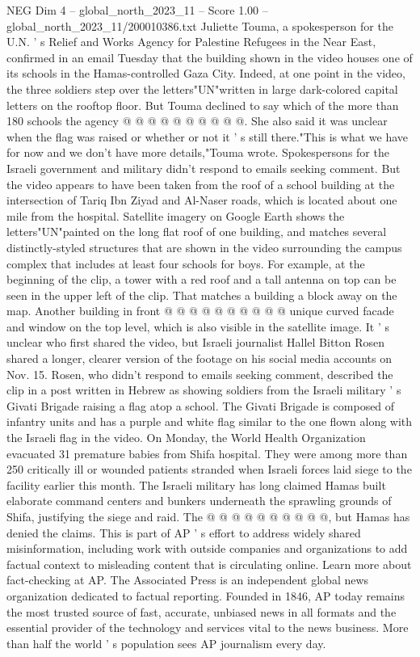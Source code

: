 \begin{textsample}{NEG Dim 4 – global\_north\_2023\_11 – Score 1.00 – global\_north\_2023\_11/200010386.txt}
Juliette Touma, a spokesperson for the U.N. ' s Relief and Works Agency for Palestine Refugees in the Near East, confirmed in an email Tuesday that the building shown in the video houses one of its schools in the Hamas-controlled Gaza City.
Indeed, at one point in the video, the three soldiers step over the letters"UN"written in large dark-colored capital letters on the rooftop floor.
But Touma declined to say which of the more than 180 schools the agency @ @ @ @ @ @ @ @ @ @.
She also said it was unclear when the flag was raised or whether or not it ' s still there."This is what we have for now and we don't have more details,"Touma wrote.
Spokespersons for the Israeli government and military didn't respond to emails seeking comment.
But the video appears to have been taken from the roof of a school building at the intersection of Tariq Ibn Ziyad and Al-Naser roads, which is located about one mile from the hospital.
Satellite imagery on Google Earth shows the letters"UN"painted on the long flat roof of one building, and matches several distinctly-styled structures that are shown in the video surrounding the campus complex that includes at least four schools for boys.
For example, at the beginning of the clip, a tower with a red roof and a tall antenna on top can be seen in the upper left of the clip.
That matches a building a block away on the map.
Another building in front @ @ @ @ @ @ @ @ @ @ unique curved facade and window on the top level, which is also visible in the satellite image.
It ' s unclear who first shared the video, but Israeli journalist Hallel Bitton Rosen shared a longer, clearer version of the footage on his social media accounts on Nov. 15.
Rosen, who didn't respond to emails seeking comment, described the clip in a post written in Hebrew as showing soldiers from the Israeli military ' s Givati Brigade raising a flag atop a school.
The Givati Brigade is composed of infantry units and has a purple and white flag similar to the one flown along with the Israeli flag in the video.
On Monday, the World Health Organization evacuated 31 premature babies from Shifa hospital.
They were among more than 250 critically ill or wounded patients stranded when Israeli forces laid siege to the facility earlier this month.
The Israeli military has long claimed Hamas built elaborate command centers and bunkers underneath the sprawling grounds of Shifa, justifying the siege and raid.
The @ @ @ @ @ @ @ @ @ @, but Hamas has denied the claims.
This is part of AP ' s effort to address widely shared misinformation, including work with outside companies and organizations to add factual context to misleading content that is circulating online.
Learn more about fact-checking at AP.
The Associated Press is an independent global news organization dedicated to factual reporting.
Founded in 1846, AP today remains the most trusted source of fast, accurate, unbiased news in all formats and the essential provider of the technology and services vital to the news business.
More than half the world ' s population sees AP journalism every day.

\end{textsample}
